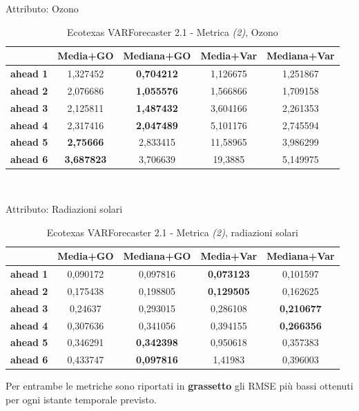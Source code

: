\documentclass[12pt,a4paper,oneside,openright]{book}
\begin{document}
\medskip

Attributo: Ozono \\ 

\begin{table}[H]
\centering
\begin{tabular}{|c|c|c|c|c|}
\hline
 & \textbf{Media+GO} & \textbf{Mediana+GO} & \textbf{Media+Var} & \textbf{Mediana+Var} \\
\hline
\textbf{ahead 1} & 1,327452 & \textbf{0,704212} & 1,126675 & 1,251867 \\
\hline
\textbf{ahead 2} & 2,076686 & \textbf{1,055576} & 1,566866 & 1,709158 \\
\hline
\textbf{ahead 3} & 2,125811 & \textbf{1,487432} & 3,604166 & 2,261353 \\
\hline
\textbf{ahead 4} & 2,317416 & \textbf{2,047489} & 5,101176 & 2,745594 \\
\hline
\textbf{ahead 5} & \textbf{2,75666} & 2,833415 & 11,58965 & 3,986299 \\
\hline
\textbf{ahead 6} & \textbf{3,687823} & 3,706639 & 19,3885 & 5,149975 \\
\hline
\end{tabular} \\
\caption{Ecotexas VARForecaster 2.1 - Metrica \textit{(2)}, Ozono}
\end{table}

\medskip

Attributo: Radiazioni solari \\ 

\begin{table}[H]
\centering
\begin{tabular}{|c|c|c|c|c|}
\hline
 & \textbf{Media+GO} & \textbf{Mediana+GO} & \textbf{Media+Var} & \textbf{Mediana+Var} \\
\hline
\textbf{ahead 1} & 0,090172 & 0,097816 & \textbf{0,073123} & 0,101597 \\
\hline
\textbf{ahead 2} & 0,175438 & 0,198805 & \textbf{0,129505} & 0,162625 \\
\hline
\textbf{ahead 3} & 0,24637 & 0,293015 & 0,286108 & \textbf{0,210677} \\
\hline
\textbf{ahead 4} & 0,307636 & 0,341056 & 0,394155 & \textbf{0,266356} \\
\hline
\textbf{ahead 5} & 0,346291 & \textbf{0,342398} & 0,950618 & 0,357383 \\
\hline
\textbf{ahead 6} & 0,433747 & \textbf{0,097816} & 1,41983 & 0,396003 \\
\hline
\end{tabular} 
\caption{Ecotexas VARForecaster 2.1 - Metrica \textit{(2)}, radiazioni solari}
\end{table}
\newpage
Per entrambe le metriche sono riportati in \textbf{grassetto} gli RMSE più bassi ottenuti per ogni istante temporale previsto. 
\end{document}

